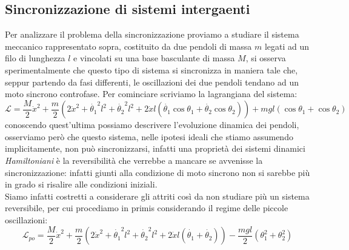 \subsection{Sincronizzazione di sistemi intergaenti}
\begin{center}
\end{center}
Per analizzare il problema della sincronizzazione proviamo a studiare il sistema meccanico rappresentato sopra, costituito da due pendoli di massa $m$ legati ad un filo di lunghezza $l$ e vincolati su una base basculante di massa $M$, si osserva sperimentalmente che questo tipo di sistema si sincronizza in maniera tale che, seppur partendo da fasi differenti, le oscillazioni dei due pendoli tendano ad un moto sincrono controfase. Per cominciare scriviamo la lagrangiana del sistema:
\begin{equation}
	\mathcal{L}=\frac{M}{2}\dot{x}^2+\frac{m}{2}(2\dot{x}^2+\dot{\theta_1}^2l^2+\dot{\theta_2}^2l^2+2\dot{x}l(\dot{\theta_1}\cos\theta_1+\dot{\theta_2}\cos\theta_2))+mgl(\cos\theta_1+\cos\theta_2)
\end{equation}
conoscendo quest'ultima possiamo descrivere l'evoluzione dinamica dei pendoli, osserviamo però che questo sistema, nelle ipotesi ideali che stiamo assumendo implicitamente, non può sincronizzarsi, infatti una proprietà dei sistemi dinamici \textit{Hamiltoniani} è la reversibilità che verrebbe a mancare se avvenisse la sincronizzazione: infatti giunti alla condizione di moto sincrono non si sarebbe più in grado si risalire alle condizioni iniziali.\\
Siamo infatti costretti a considerare gli attriti così da non studiare più un sistema reversibile, per cui procediamo in primis considerando il regime delle piccole oscillazioni:
\begin{equation}
	\mathcal{L}_{po}=\frac{M}{2}\dot{x}^2+\frac{m}{2}(2\dot{x}^2+\dot{\theta_1}^2l^2+\dot{\theta_2}^2l^2+2\dot{x}l(\dot{\theta_1}+\dot{\theta_2}))-\frac{mgl}{2}(\theta_1^2+\theta_2^2)
\end{equation}
